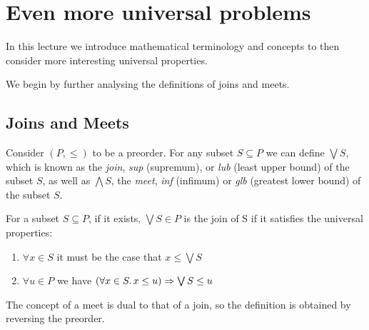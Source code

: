 \chapter{Even more universal problems}

In this lecture we introduce mathematical terminology and concepts to then
consider more interesting universal properties.

We begin by further analysing the definitions of joins and meets.

\section{Joins and Meets}

Consider $(P, \leq)$ to be a preorder. For any subset $S \subseteq P$ we can
define $\bigvee S$, which is known as the \emph{join}, \emph{sup} (supremum),
or \emph{lub} (least upper bound) of the subset $S$, as well as $\bigwedge S$,
the \emph{meet}, \emph{inf} (infimum) or \emph{glb} (greatest lower bound)  of
the subset $S$.

\begin{definition}[Joins]
\label{defjoins}
    For a subset $S \subseteq P$, if it exists, $\bigvee S \in P$ is the join
    of S if it satisfies the universal properties:
        \begin{enumerate}
            \item $\forall x \in S$ it must be the case that $x \leq \bigvee S$
            \item $\forall u \in P$ we have $(\forall x \in S \ldotp x \leq u)
                \Rightarrow \bigvee S \leq u$
        \end{enumerate}
\end{definition}

The concept of a meet is dual to that of a join, so the definition is obtained
by reversing the preorder.

